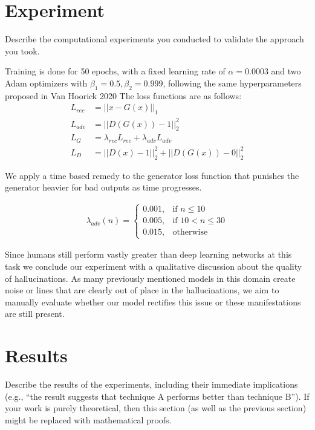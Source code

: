 \documentclass{article}
\begin{document}
\section{Experiment}
Describe the computational experiments you conducted to validate the approach you took.

Training is done for 50 epochs, with a fixed learning rate of $\alpha=0.0003$ and two Adam optimizers with $\beta_1=0.5, \beta_2=0.999$, following the same hyperparameters proposed in Van Hoorick 2020 \cite{van_hoorick_image_2020} The loss functions are as follows:
\begin{align}
  L_{rec} &= ||x-G(x)||_1 \\
  L_{adv} &= ||D(G(x))-1||_2^2 \\
  L_G &= \lambda_{rec}L_{rec} + \lambda_{adv}L_{adv} \\
  L_D &= ||D(x)-1||_2^2 + ||D(G(x))-0||_2^2
\end{align}

We apply a time based remedy to the generator loss function that punishes the generator heavier for bad outputs as time progresses.

\begin{align}
  \lambda_{adv}(n) = \begin{cases}
    0.001, & \text{if }n\leq10 \\
    0.005, & \text{if }10<n\leq30 \\
    0.015, & \text{otherwise}
  \end{cases}
  \label{eq:loss_adv}
\end{align}

Since humans still perform vastly greater than deep learning networks at this task we conclude our experiment with a qualitative discussion about the quality of hallucinations. As many previously mentioned models in this domain create noise or lines that are clearly out of place in the hallucinations, we aim to manually evaluate whether our model rectifies this issue or these manifestations are still present.

\section{Results}
Describe the results of the experiments, including their immediate implications (e.g., ``the result suggests that technique A performs better
than technique B''). If your work is purely theoretical, then this section (as well as the previous section) might be replaced with mathematical proofs.
\end{document}
